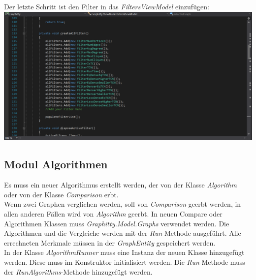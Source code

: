 \documentclass[13pt]{scrreprt}
\begin{document}
Der letzte Schritt ist den Filter in das \textit{FiltersViewModel} einzufügen:\\
\includegraphics[scale=0.5,center]{FilterViewModel.PNG}

\newpage

\subsection{Modul Algorithmen}
Es muss ein neuer Algorithmus erstellt werden, der von der Klasse \textit{Algorithm} oder von der Klasse \textit{Comparison} erbt.\\
Wenn zwei Graphen verglichen werden, soll von \textit{Comparison} geerbt werden, in allen anderen Fällen wird von \textit{Algorithm} geerbt. In neuen Compare oder Algorithmen Klassen muss \textit{Graphitty.Model.Graphs} verwendet werden.
Die Algorithmen und die Vergleiche werden mit der \textit{Run}-Methode ausgeführt.
Alle errechneten Merkmale müssen in der \textit{GraphEntity} gespeichert werden.\\
In der Klasse \textit{AlgorithmRunner} muss eine Instanz der neuen Klasse hinzugefügt werden. Diese muss im Konstruktor initialisiert werden. Die \textit{Run}-Methode muss der \textit{RunAlgorithms}-Methode hinzugefügt werden.\\
\\
\end{document}

